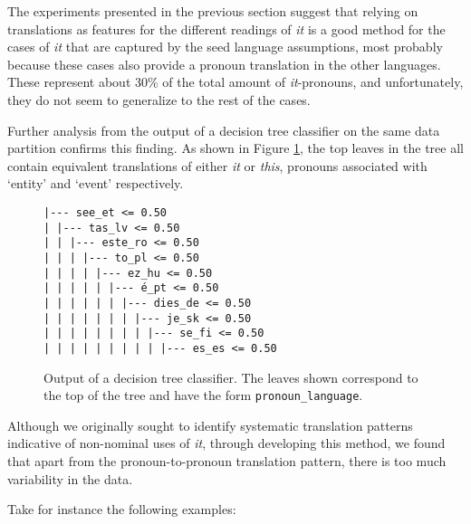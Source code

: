 \documentclass[10pt, a4paper]{article}
\begin{document}
The experiments presented in the previous section suggest that relying on 
translations as features for the different readings of \textit{it} is a good 
method for 
the cases of \textit{it} that are captured by the seed language assumptions, 
most probably because  
these cases also provide a pronoun translation in the other languages. These 
represent about 30\% of the total amount of \textit{it}-pronouns, and unfortunately, they do not seem to generalize to the rest of the 
cases. 

Further analysis from the output of a decision tree classifier on the same data 
partition confirms this finding. As shown in Figure \ref{fig:decisiontree}, the 
top leaves in the tree all contain equivalent translations of either \textit{it} or 
\textit{this}, pronouns associated with `entity' and `event' respectively. 


\begin{figure}\small
\begin{verbatim}
|--- see_et <= 0.50
| |--- tas_lv <= 0.50
| | |--- este_ro <= 0.50
| | | |--- to_pl <= 0.50
| | | | |--- ez_hu <= 0.50
| | | | | |--- é_pt <= 0.50
| | | | | | |--- dies_de <= 0.50
| | | | | | | |--- je_sk <= 0.50
| | | | | | | | |--- se_fi <= 0.50
| | | | | | | | | |--- es_es <= 0.50
\end{verbatim}
\caption{Output of a decision tree classifier. The leaves shown correspond to
the top of the tree and have the form \texttt{pronoun\_language}.}\label{fig:decisiontree}
\end{figure}




Although we originally sought to identify systematic translation patterns 
indicative of non-nominal uses of \textit{it}, through 
developing this method, we found that apart from the pronoun-to-pronoun 
translation pattern, there is too much variability in the data. 

Take for instance the following examples:
\end{document}

